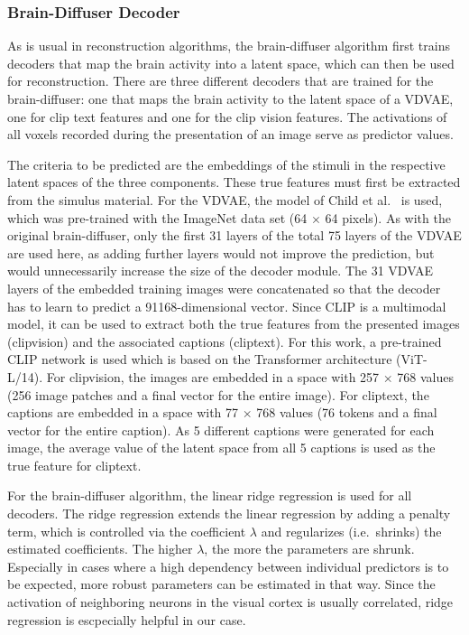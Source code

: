 \subsubsection{Brain-Diffuser Decoder}
As is usual in reconstruction algorithms, the brain-diffuser algorithm first trains decoders that map the brain activity into a latent space, which can then be used for reconstruction. There are three different decoders that are trained for the brain-diffuser: one that maps the brain activity to the latent space of a VDVAE, one for clip text features and one for the clip vision features. The activations of all voxels recorded during the presentation of an image serve as predictor values.

The criteria to be predicted are the embeddings of the stimuli in the respective latent spaces of the three components. These true features must first be extracted from the simulus material. For the VDVAE, the model of Child et al.\ \cite{childVeryDeepVAEs2020} is used, which was pre-trained with the ImageNet data set (64 $\times$ 64 pixels). As with the original brain-diffuser, only the first 31 layers of the total 75 layers of the VDVAE are used here, as adding further layers would not improve the prediction, but would unnecessarily increase the size of the decoder module. The 31 VDVAE layers of the embedded training images were concatenated so that the decoder has to learn to predict a 91168-dimensional vector. 
Since CLIP\cite{radfordLearningTransferableVisual2021} is a multimodal model, it can be used to extract both the true features from the presented images (clipvision) and the associated captions (cliptext). For this work, a pre-trained CLIP network is used which is based on the Transformer architecture (ViT-L/14). For clipvision, the images are embedded in a space with 257 $\times$ 768 values (256 image patches and a final vector for the entire image). For cliptext, the captions are embedded in a space with 77 $\times$ 768 values (76 tokens and a final vector for the entire caption). As 5 different captions were generated for each image, the average value of the latent space from all 5 captions is used as the true feature for cliptext.


For the brain-diffuser algorithm, the linear ridge regression\cite{hoerlRidgeRegressionBiased1970} is used for all decoders. The ridge regression extends the linear regression by adding a penalty term, which is controlled via the coefficient $\lambda$ and regularizes (i.e.\ shrinks) the estimated coefficients. The higher $\lambda$, the more the parameters are shrunk. Especially in cases where a high dependency between individual predictors is to be expected, more robust parameters can be estimated in that way. Since the activation of neighboring neurons in the visual cortex is usually correlated\cite{smithSpatialTemporalScales2008}, ridge regression is escpecially helpful in our case.

